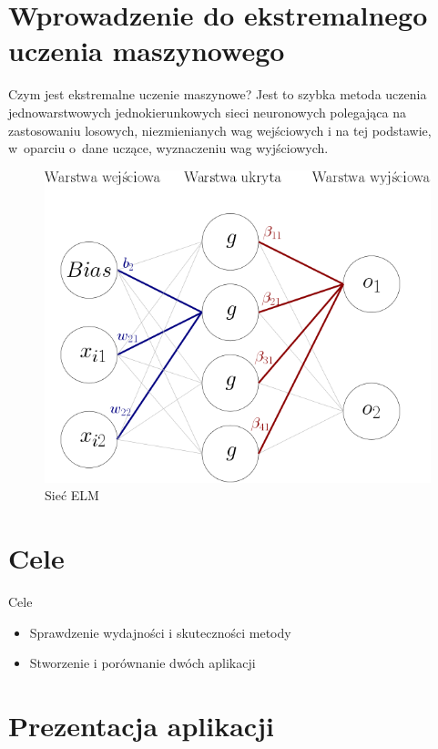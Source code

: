 \documentclass{beamer}
\begin{document}
\section{Wprowadzenie do ekstremalnego uczenia maszynowego}
\begin{frame}{Czym jest ekstremalne uczenie maszynowe?}
Jest to szybka metoda uczenia jednowarstwowych jednokierunkowych sieci neuronowych polegająca na zastosowaniu losowych, niezmienianych wag wejściowych i na tej podstawie, w~oparciu o~dane uczące, wyznaczeniu wag wyjściowych.
\begin{figure}[H]
\includegraphics[scale=0.4]{schemat_sieci.png}
\caption{Sieć ELM}
\end{figure}
\end{frame}
\section{Cele}
\begin{frame}{Cele}
\begin{itemize}
\item Sprawdzenie wydajności i skuteczności metody
\item Stworzenie i porównanie dwóch aplikacji
\end{itemize}
\end{frame}
\section{Prezentacja aplikacji}
\end{document}
